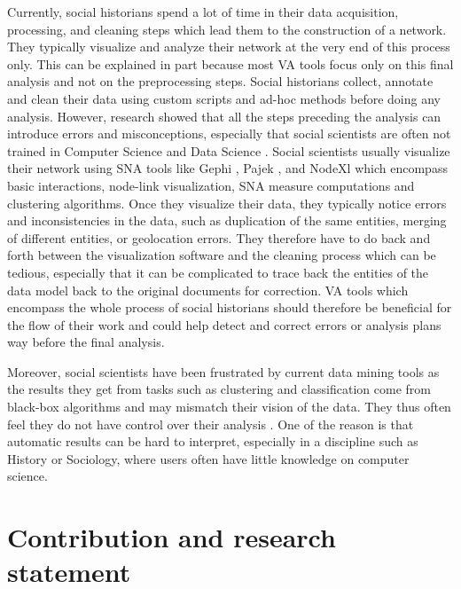 Currently, social historians spend a lot of time in their data acquisition, processing, and cleaning steps which lead them to the construction of a network.
They typically visualize and analyze their network at the very end of this process only.
This can be explained in part because most VA tools focus only on this final analysis and not on the preprocessing steps.
Social historians collect, annotate and clean their data using custom scripts and ad-hoc methods before doing any analysis.
However, research showed that all the steps preceding the analysis can introduce errors and misconceptions, especially that social scientists are often not trained in Computer Science and Data Science \cite{lemercier12FormalNetwork2015a, lkadi2022}.
Social scientists usually visualize their network using SNA tools like Gephi \cite{Gephi}, Pajek \cite{pajek}, and NodeXl \cite{noauthor_nodexl_nodate} which encompass basic interactions, node-link visualization, SNA measure computations and clustering algorithms.
Once they visualize their data, they typically notice errors and inconsistencies in the data, such as duplication of the same entities, merging of different entities, or geolocation errors.
They therefore have to do back and forth between the visualization software and the cleaning process which can be tedious, especially that it can be complicated to trace back the entities of the data model back to the original documents for correction.
VA tools which encompass the whole process of social historians should therefore be beneficial for the flow of their work and could help detect and correct errors or analysis plans way before the final analysis.

Moreover, social scientists have been frustrated by current data mining tools as the results they get from tasks such as clustering and classification come from black-box algorithms and may mismatch their vision of the data.
They thus often feel they do not have control over their analysis \cite{lepetitHistoireQuantitativeDeux1989}.
One of the reason is that automatic results can be hard to interpret, especially in a discipline such as History or Sociology, where users often have little knowledge on computer science.



\section{Contribution and research statement}\label{sec:contribution-and-research-statement}



